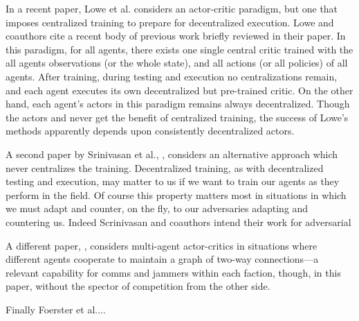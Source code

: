 \documentclass{article}
\begin{document}
In a recent paper, Lowe et al. \cite{lowe2017multi} considers an
actor-critic paradigm, but one that imposes centralized training to
prepare for decentralized execution.  Lowe and coauthors cite a recent
body of previous work briefly reviewed in their paper.  In this
paradigm, for all agents, there exists one single central critic
trained with the all agents observations (or the whole state), and all
actions (or all policies) of all agents.  After training, during
testing and execution no centralizations remain, and each agent
executes its own decentralized but pre-trained critic.  On the other
hand, each agent's actors in this paradigm remains always
decentralized.  Though the actors and never get the benefit of
centralized training, the success of Lowe's methods apparently depends
upon consistently decentralized actors.

A second paper by Srinivasan et al., \cite{srinivasan2018actor},
considers an alternative approach which never centralizes the
training.  Decentralized training, as with decentralized testing and
execution, may matter to us if we want to train our agents as they
perform in the field.  Of course this property matters most in
situations in which we must adapt and counter, on the fly, to our
adversaries adapting and countering us.  Indeed Scrinivasan and
coauthors intend their work for adversarial

A different paper, \cite{su2020counterfactual}, considers multi-agent
actor-critics in situations where different agents cooperate to
maintain a graph of two-way connections---a relevant capability for
comms and jammers within each faction, though, in this paper, without
the spector of competition from the other side.

Finally Foerster et al....


% 

\end{document}
